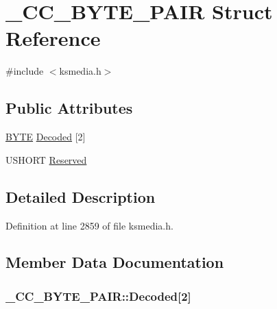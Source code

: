 \hypertarget{struct___c_c___b_y_t_e___p_a_i_r}{}\section{\+\_\+\+C\+C\+\_\+\+B\+Y\+T\+E\+\_\+\+P\+A\+IR Struct Reference}
\label{struct___c_c___b_y_t_e___p_a_i_r}


{\ttfamily \#include $<$ksmedia.\+h$>$}

\subsection*{Public Attributes}
\begin{DoxyCompactItemize}
\item 
\hyperlink{mapinls_8h_a4ae1dab0fb4b072a66584546209e7d58}{B\+Y\+TE} \hyperlink{struct___c_c___b_y_t_e___p_a_i_r_a4a0210ba081fc1e235f4267837a2bac0}{Decoded} \mbox{[}2\mbox{]}
\item 
U\+S\+H\+O\+RT \hyperlink{struct___c_c___b_y_t_e___p_a_i_r_aa9468f0020461de0ee1d48925e248978}{Reserved}
\end{DoxyCompactItemize}


\subsection{Detailed Description}


Definition at line 2859 of file ksmedia.\+h.



\subsection{Member Data Documentation}
\subsubsection[{\texorpdfstring{Decoded}{Decoded}}]{ \+\_\+\+C\+C\+\_\+\+B\+Y\+T\+E\+\_\+\+P\+A\+I\+R\+::\+Decoded\mbox{[}2\mbox{]}}\hypertarget{struct___c_c___b_y_t_e___p_a_i_r_a4a0210ba081fc1e235f4267837a2bac0}{}\label{struct___c_c___b_y_t_e___p_a_i_r_a4a0210ba081fc1e235f4267837a2bac0}



